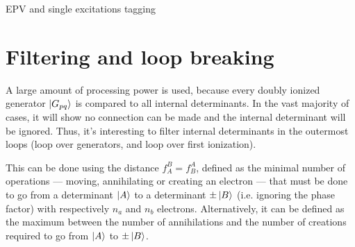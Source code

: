 \documentclass[./thesis.tex]{subfiles}
\begin{document}
\begin{algorithm}
        \caption{EPV and single excitations tagging}
        \label{alg:unblock_single}

                        
\end{algorithm}



\section{Filtering and loop breaking}

A large amount of processing power is used, because every doubly ionized generator $\ket {G_{pq}}$ is compared to all internal determinants. In the vast majority of cases, it will show no connection can be made and the internal determinant will be ignored. Thus, it's interesting to filter internal determinants in the outermost loops (loop over generators, and loop over first ionization).

This can be done using the distance $f_A^B = f_B^A$, defined as the minimal number of operations --- moving, annihilating or creating an electron --- that must be done to go from a determinant $\ket A$ to a determinant $\pm \ket B$ (i.e. ignoring the phase factor) with respectively $n_a$ and $n_b$ electrons.
Alternatively, it can be defined as the maximum between the number of annihilations and the number of creations required to go from $\ket A$ to $\pm \ket B$.
\end{document}
